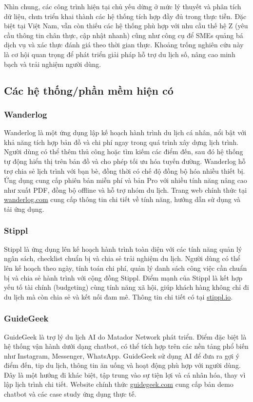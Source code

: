 Nhìn chung, các công trình hiện tại chủ yếu dừng ở mức lý thuyết và phân tích dữ liệu, chưa triển khai thành các hệ thống tích hợp đầy đủ trong thực tiễn. Đặc biệt tại Việt Nam, vẫn còn thiếu các hệ thống phù hợp với nhu cầu thế hệ Z (yêu cầu thông tin chân thực, cập nhật nhanh) cũng như công cụ để SMEs quảng bá dịch vụ và xác thực đánh giá theo thời gian thực. Khoảng trống nghiên cứu này là cơ hội quan trọng để phát triển giải pháp hỗ trợ du lịch số, nâng cao minh bạch và trải nghiệm người dùng.

\subsection{Các hệ thống/phần mềm hiện có}
\subsubsection{Wanderlog}
Wanderlog là một ứng dụng lập kế hoạch hành trình du lịch cá nhân, nổi bật với khả năng tích hợp bản đồ và chi phí ngay trong quá trình xây dựng lịch trình. Người dùng có thể thêm thủ công hoặc tìm kiếm các điểm đến, sau đó hệ thống tự động hiển thị trên bản đồ và cho phép tối ưu hóa tuyến đường. Wanderlog hỗ trợ chia sẻ lịch trình với bạn bè, đồng thời có chế độ đồng bộ hóa nhiều thiết bị. Ứng dụng cung cấp phiên bản miễn phí và bản Pro với nhiều tính năng nâng cao như xuất PDF, đồng bộ offline và hỗ trợ nhóm du lịch. Trang web chính thức tại \href{wanderlog.com}{wanderlog.com} cung cấp thông tin chi tiết về tính năng, hướng dẫn sử dụng và tải ứng dụng.

\subsubsection{Stippl}
Stippl là ứng dụng lên kế hoạch hành trình toàn diện với các tính năng quản lý ngân sách, checklist chuẩn bị và chia sẻ trải nghiệm du lịch. Người dùng có thể lên kế hoạch theo ngày, tính toán chi phí, quản lý danh sách công việc cần chuẩn bị và chia sẻ hành trình với cộng đồng Stippl. Điểm mạnh của Stippl là kết hợp yếu tố tài chính (budgeting) cùng tính năng xã hội, giúp khách hàng không chỉ đi du lịch mà còn chia sẻ và kết nối đam mê. Thông tin chi tiết có tại \href{stippl.io}{stippl.io}.

\subsubsection{GuideGeek}
GuideGeek là trợ lý du lịch AI do Matador Network phát triển. Điểm đặc biệt là hệ thống vận hành dưới dạng chatbot, có thể tích hợp trên các nền tảng phổ biến như Instagram, Messenger, WhatsApp. GuideGeek sử dụng AI để đưa ra gợi ý điểm đến, tip du lịch, thông tin ăn uống và hoạt động phù hợp với người dùng. Đây là một hướng đi khác biệt, tập trung vào sự tiện lợi và cá nhân hóa, thay vì lập lịch trình chi tiết. Website chính thức \href{guidegeek.com}{guidegeek.com} cung cấp bản demo chatbot và các case study ứng dụng thực tế.

